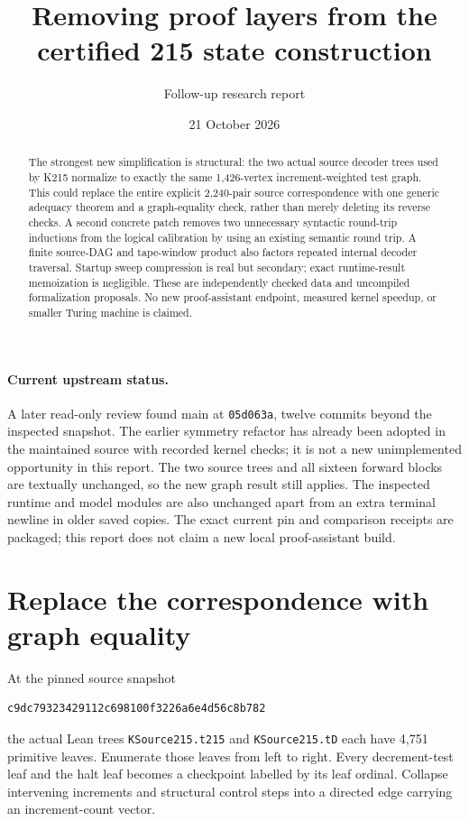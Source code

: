 \documentclass[11pt]{article}
\title{Removing proof layers from the certified 215 state construction}
\author{Follow-up research report}\date{21 October 2026}
\begin{document}
\maketitle
\begin{abstract}
The strongest new simplification is structural: the two actual source decoder trees used by K215 normalize to exactly the same 1,426-vertex increment-weighted test graph. This could replace the entire explicit 2,240-pair source correspondence with one generic adequacy theorem and a graph-equality check, rather than merely deleting its reverse checks. A second concrete patch removes two unnecessary syntactic round-trip inductions from the logical calibration by using an existing semantic round trip. A finite source-DAG and tape-window product also factors repeated internal decoder traversal. Startup sweep compression is real but secondary; exact runtime-result memoization is negligible. These are independently checked data and uncompiled formalization proposals. No new proof-assistant endpoint, measured kernel speedup, or smaller Turing machine is claimed.
\end{abstract}

\paragraph{Current upstream status.}
A later read-only review found main at \texttt{05d063a}, twelve commits beyond the inspected snapshot. The earlier symmetry refactor has already been adopted in the maintained source with recorded kernel checks; it is not a new unimplemented opportunity in this report. The two source trees and all sixteen forward blocks are textually unchanged, so the new graph result still applies. The inspected runtime and model modules are also unchanged apart from an extra terminal newline in older saved copies. The exact current pin and comparison receipts are packaged; this report does not claim a new local proof-assistant build.

\section{Replace the correspondence with graph equality}
At the pinned source snapshot
\begin{verbatim}
c9dc79323429112c698100f3226a6e4d56c8b782
\end{verbatim}
the actual Lean trees \texttt{KSource215.t215} and \texttt{KSource215.tD} each have 4,751 primitive leaves. Enumerate those leaves from left to right. Every decrement-test leaf and the halt leaf becomes a checkpoint labelled by its leaf ordinal. Collapse intervening increments and structural control steps into a directed edge carrying an increment-count vector.
\end{document}

